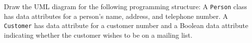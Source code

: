 Draw the UML diagram for the following programming structure: A \texttt{Person} class has data attributes for a person's name, address, and telephone number. A \texttt{Customer} has data attribute for a customer number and a Boolean data attribute indicating whether the customer wishes to be on a mailing list.